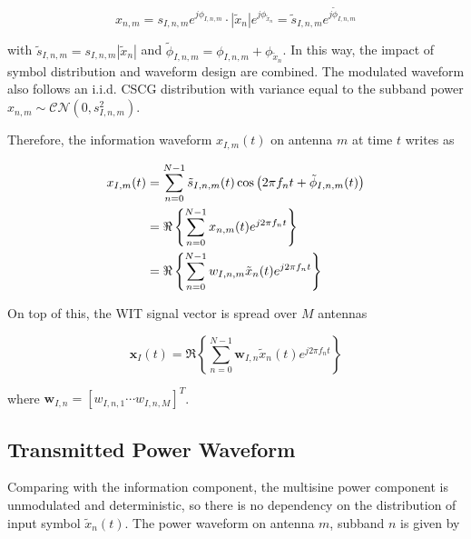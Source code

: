 \begin{equation}\label{eqn:modulated_symbol_further}
  {x_{n,m}} = {s_{I,n,m}}{e^{j{\phi _{I,n,m}}}} \cdot \left| {{{\tilde x}_n}} \right|{e^{j{\phi _{{{\tilde x}_n}}}}} = {{\tilde s}_{I,n,m}}{e^{j{{\tilde \phi }_{I,n,m}}}}
\end{equation}

with ${{\tilde s}_{I,n,m}} = {s_{I,n,m}}\left| {{{\tilde x}_n}} \right|$ and ${{\tilde \phi }_{I,n,m}} = {\phi _{I,n,m}} + {\phi _{{{\tilde x}_n}}}$. In this way, the impact of symbol distribution and waveform design are combined. The modulated waveform also follows an i.i.d. CSCG distribution with variance equal to the subband power ${x_{n,m}}\sim\mathcal{C}\mathcal{N}\left( {0,s_{I,n,m}^2} \right)$.

Therefore, the information waveform ${x_{I,m}}(t)$ on antenna $m$ at time $t$ writes as

\begin{align}\label{eqn:information_waveform}
  {x_{I,m}}(t) &= \sum\limits_{n = 0}^{N - 1} {{{\tilde s}_{I,n,m}}(t)\cos \left( {2\pi {f_n}t + {{\tilde \phi }_{I,n,m}}(t)} \right)}  \hfill \\
   &= \Re \left\{ {\sum\limits_{n = 0}^{N - 1} {{x_{n,m}}(t){e^{j2\pi {f_n}t}}} } \right\} \hfill \\
   &= \Re \left\{ {\sum\limits_{n = 0}^{N - 1} {{w_{I,n,m}}{{\tilde x}_n}(t){e^{j2\pi {f_n}t}}} } \right\} \hfill
\end{align}

On top of this, the WIT signal vector is spread over $M$ antennas

\begin{equation}\label{eqn:wit_vector}
  {{\mathbf{x}}_I}(t) = \Re \left\{ {\sum\limits_{n = 0}^{N - 1} {{{\mathbf{w}}_{I,n}}} {{\tilde x}_n}(t){e^{j2\pi {f_n}t}}} \right\}
\end{equation}

where ${{\mathbf{w}}_{I,n}} = {\left[ {{w_{I,n,1}} \cdots {w_{I,n,M}}} \right]^T}$.



\subsection{Transmitted Power Waveform}\label{sec:transmitted-power-waveform}
Comparing with the information component, the multisine power component is unmodulated and deterministic, so there is no dependency on the distribution of input symbol $\tilde{x}_{n}(t)$. The power waveform on antenna $m$, subband $n$ is given by


